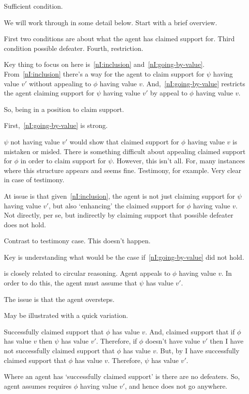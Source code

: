\begin{note}
  Sufficient condition.

  We will work through \nI{} in some detail below.
  Start with a brief overview.

  First two conditions are about what the agent has claimed support for.
  Third condition possible defeater.
  Fourth, restriction.

  Key thing to focus on here is~\ref{nI:inclusion} and~\ref{nI:going-by-value}.
  From~\ref{nI:inclusion} there's a way for the agent to claim support for \(\psi\) having value \(v'\) without appealing to \(\phi\) having value \(v\).
  And,~\ref{nI:going-by-value} restricts the agent claiming support for \(\psi\) having value \(v'\) by appeal to \(\phi\) having value \(v\).

  So, being in a position to claim support.

  First,~\ref{nI:going-by-value} is strong.

  \(\psi\) not having value \(v'\) would show that claimed support for \(\phi\) having value \(v\) is mistaken or misled.
  There is something difficult about appealing claimed support for \(\phi\) in order to claim support for \(\psi\).
  However, this isn't all.
  For, many instances where this structure appears and seems fine.
  Testimony, for example.
  Very clear in case of testimony.

  At issue is that given~\ref{nI:inclusion}, the agent is not just claiming support for \(\psi\) having value \(v'\), but also `enhancing' the claimed support for \(\phi\) having value \(v\).
  Not directly, per se, but indirectly by claiming support that possible defeater does not hold.

  Contrast to testimony case.
  This doesn't happen.

  Key is understanding what would be the case if~\ref{nI:going-by-value} did not hold.
\end{note}

\begin{note}
  \nI{} is closely related to circular reasoning.
  Agent appeals to \(\phi\) having value \(v\).
  In order to do this, the agent must assume that \(\psi\) has value \(v'\).

  The issue is that the agent oversteps.

  May be illustrated with a quick variation.

  Successfully claimed support that \(\phi\) has value \(v\).
  And, claimed support that if \(\phi\) has value \(v\) then \(\psi\) has value \(v'\).
  Therefore, if \(\phi\) doesn't have value \(v'\) then I have not successfully claimed support that \(\phi\) has value \(v\).
  But, by I have successfully claimed support that \(\phi\) has value \(v\).
  Therefore, \(\psi\) has value \(v'\).

  Where an agent has `successfully claimed support' is there are no defeaters.
  So, agent assumes requires \(\phi\) having value \(v'\), and hence does not go anywhere.
\end{note}

